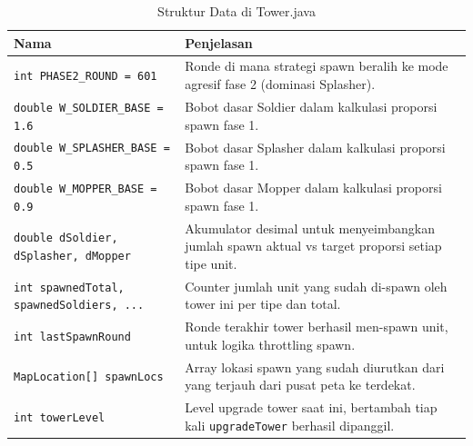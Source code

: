 \documentclass{article}
\begin{document}
\begin{enumerate}[label=\alph*.]
\begin{longtable}{|p{}|p{}|}
    \caption{Struktur Data di Tower.java} \\
\hline
\textbf{Nama} & \textbf{Penjelasan} \\
\hline
\endhead
\hline
\endfoot
\texttt{int PHASE2\_ROUND = 601} & Ronde di mana strategi spawn beralih ke mode agresif fase 2 (dominasi Splasher). \\
\hline
\texttt{double W\_SOLDIER\_BASE = 1.6} & Bobot dasar Soldier dalam kalkulasi proporsi spawn fase 1. \\
\hline
\texttt{double W\_SPLASHER\_BASE = 0.5} & Bobot dasar Splasher dalam kalkulasi proporsi spawn fase 1. \\
\hline
\texttt{double W\_MOPPER\_BASE = 0.9} & Bobot dasar Mopper dalam kalkulasi proporsi spawn fase 1. \\
\hline
\texttt{double dSoldier, dSplasher, dMopper} & Akumulator desimal untuk menyeimbangkan jumlah spawn aktual vs target proporsi setiap tipe unit. \\
\hline
\texttt{int spawnedTotal, spawnedSoldiers, ...} & Counter jumlah unit yang sudah di-spawn oleh tower ini per tipe dan total. \\
\hline
\texttt{int lastSpawnRound} & Ronde terakhir tower berhasil men-spawn unit, untuk logika throttling spawn. \\
\hline
\texttt{MapLocation[] spawnLocs} & Array lokasi spawn yang sudah diurutkan dari yang terjauh dari pusat peta ke terdekat. \\
\hline
\texttt{int towerLevel} & Level upgrade tower saat ini, bertambah tiap kali \texttt{upgradeTower} berhasil dipanggil. \\
\hline
\end{longtable}


\end{enumerate}
\end{document}
